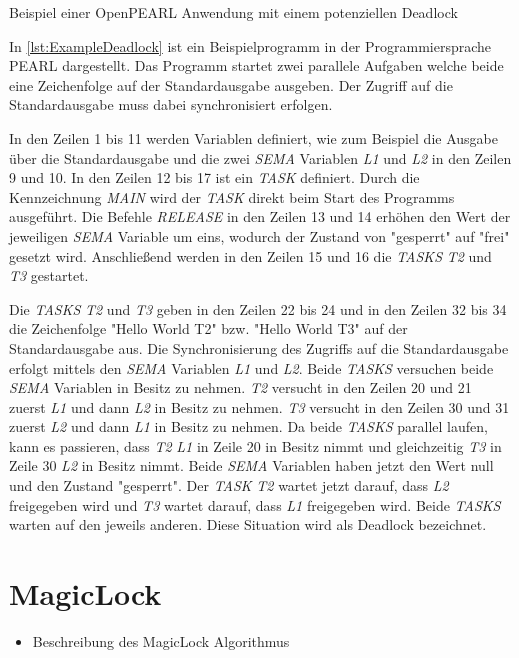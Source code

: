 \begin{listing}[ht]
  \inputminted[frame=lines,linenos]{vim}{./Examples/Example_Deadlock.prl}
  \caption{Beispiel einer OpenPEARL Anwendung mit einem potenziellen Deadlock}    
  \label{lst:ExampleDeadlock}   
\end{listing} 

In \cref{lst:ExampleDeadlock} ist ein Beispielprogramm in der Programmiersprache
PEARL dargestellt. Das Programm startet zwei parallele Aufgaben welche beide eine Zeichenfolge auf der Standardausgabe ausgeben. Der Zugriff auf die Standardausgabe muss dabei synchronisiert erfolgen.

In den Zeilen 1 bis 11 werden Variablen definiert, wie zum Beispiel die Ausgabe über die Standardausgabe und die zwei \textit{SEMA} Variablen \textit{L1} und \textit{L2} in den Zeilen 9 und 10. In den Zeilen 12 bis 17 ist ein \textit{TASK} definiert. Durch die Kennzeichnung \textit{MAIN} wird der \textit{TASK} direkt beim Start des Programms ausgeführt. Die Befehle \textit{RELEASE} in den Zeilen 13 und 14 erhöhen den Wert der jeweiligen \textit{SEMA} Variable um eins, wodurch der Zustand von "gesperrt" auf "frei" gesetzt wird. Anschließend werden in den Zeilen 15 und 16 die \textit{TASKS} \textit{T2} und \textit{T3} gestartet.

Die \textit{TASKS} \textit{T2} und \textit{T3} geben in den Zeilen 22 bis 24 und in den Zeilen 32 bis 34 die Zeichenfolge "Hello World T2" bzw. "Hello World T3" auf der Standardausgabe aus. Die Synchronisierung des Zugriffs auf die Standardausgabe erfolgt mittels den \textit{SEMA} Variablen \textit{L1} und \textit{L2}. Beide \textit{TASKS} versuchen beide \textit{SEMA} Variablen in Besitz zu nehmen. \textit{T2} versucht in den Zeilen 20 und 21 zuerst \textit{L1} und dann \textit{L2} in Besitz zu nehmen. \textit{T3} versucht in den Zeilen 30 und 31 zuerst \textit{L2} und dann \textit{L1} in Besitz zu nehmen. Da beide \textit{TASKS} parallel laufen, kann es passieren, dass \textit{T2} \textit{L1} in Zeile 20 in Besitz nimmt und gleichzeitig \textit{T3} in Zeile 30 \textit{L2} in Besitz nimmt. Beide \textit{SEMA} Variablen haben jetzt den Wert null und den Zustand "gesperrt". Der \textit{TASK} \textit{T2} wartet jetzt darauf, dass \textit{L2} freigegeben wird und \textit{T3} wartet darauf, dass \textit{L1} freigegeben wird. Beide \textit{TASKS} warten auf den jeweils anderen. Diese Situation wird als Deadlock bezeichnet.

\section{MagicLock}
\label{section:MagicLock}
\begin{itemize}
  \item Beschreibung des MagicLock \autocite{MagicLock} Algorithmus
\end{itemize}